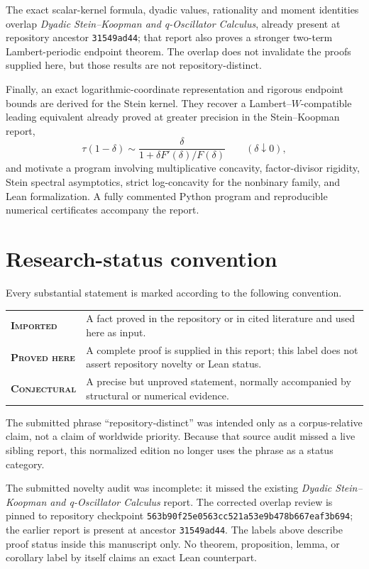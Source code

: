 \documentclass[11pt,oneside]{article}
\theoremstyle{definition}
\theoremstyle{remark}
\newcommand{\Imported}{\textsc{Imported}}
\newcommand{\ProvedHere}{\textsc{Proved here}}
\newcommand{\Conjectural}{\textsc{Conjectural}}
\begin{document}
The exact scalar-kernel formula, dyadic values, rationality and moment identities
overlap \emph{Dyadic Stein--Koopman and q-Oscillator Calculus}, already present
at repository ancestor \nolinkurl{31549ad44}; that report also proves a stronger
two-term Lambert-periodic endpoint theorem.  The overlap does not invalidate the
proofs supplied here, but those results are not repository-distinct.

Finally, an exact logarithmic-coordinate representation and rigorous endpoint
bounds are derived for the Stein kernel.  They recover a Lambert--$W$-compatible
leading equivalent already proved at greater precision in the Stein--Koopman
report,
\[
 \tau(1-\delta)\sim \frac{\delta}{1+\delta F'(\delta)/F(\delta)}
 \qquad (\delta\downarrow0),
\]
and motivate a program involving multiplicative concavity, factor-divisor rigidity,
Stein spectral asymptotics, strict log-concavity for the nonbinary family, and
Lean formalization.  A fully commented Python program and reproducible numerical
certificates accompany the report.

\section*{Research-status convention}
Every substantial statement is marked according to the following convention.

\begin{center}
\begin{tabularx}{0.92\textwidth}{>{\bfseries}l X}
\toprule
\Imported & A fact proved in the repository or in cited literature and used here as input.\\
\ProvedHere & A complete proof is supplied in this report; this label does not assert repository novelty or Lean status.\\
\Conjectural & A precise but unproved statement, normally accompanied by structural or numerical evidence.\\
\bottomrule
\end{tabularx}
\end{center}

The submitted phrase ``repository-distinct'' was intended only as a
corpus-relative claim, not a claim of worldwide priority.  Because that source
audit missed a live sibling report, this normalized edition no longer uses the
phrase as a status category.

The submitted novelty audit was incomplete: it missed the existing
\emph{Dyadic Stein--Koopman and q-Oscillator Calculus} report.  The corrected
overlap review is pinned to repository checkpoint
\nolinkurl{563b90f25e0563cc521a53e9b478b667eaf3b694}; the earlier report is
present at ancestor \nolinkurl{31549ad44}.  The labels above describe proof
status inside this manuscript only.  No theorem, proposition, lemma, or
corollary label by itself claims an exact Lean counterpart.
\end{document}
